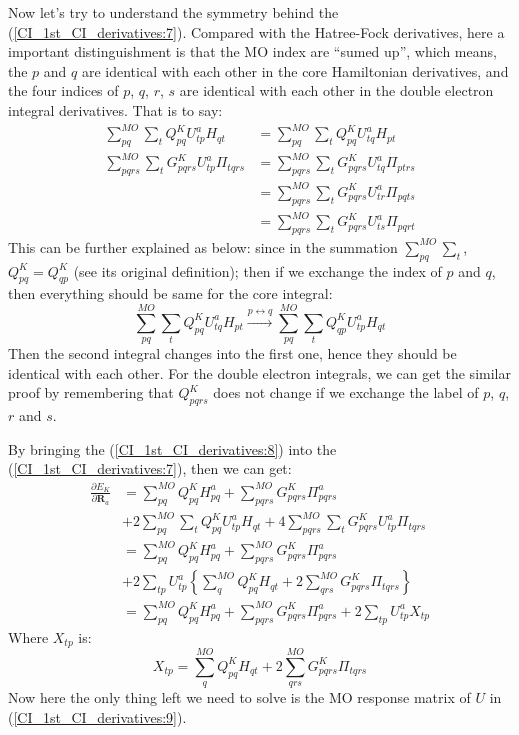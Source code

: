 Now let's try to understand the symmetry behind the
(\ref{CI_1st_CI_derivatives:7}). Compared with the Hatree-Fock derivatives,
here a important distinguishment is that the MO index are ``sumed up'', which
means, the $p$ and $q$ are identical with each other in the core Hamiltonian
derivatives, and the four indices of $p$, $q$, $r$, $s$ are identical with each
other in the double electron integral derivatives. That is to say:
\begin{equation}
 \begin{split}
  \sum_{pq}^{MO}\sum_{t}Q^{K}_{pq}U^{a}_{tp}H_{qt} &=
  \sum_{pq}^{MO}\sum_{t}Q^{K}_{pq}U^{a}_{tq}H_{pt} \\
\sum_{pqrs}^{MO} \sum_{t}G^{K}_{pqrs}
U^{a}_{tp}\Pi_{tqrs}  
&= 
\sum_{pqrs}^{MO} \sum_{t}G^{K}_{pqrs} 
U^{a}_{tq}\Pi_{ptrs} \\ 
&= 
\sum_{pqrs}^{MO} \sum_{t}G^{K}_{pqrs} 
U^{a}_{tr}\Pi_{pqts}  \\
&=
\sum_{pqrs}^{MO} \sum_{t}G^{K}_{pqrs} 
U^{a}_{ts}\Pi_{pqrt}  
 \end{split}
\label{CI_1st_CI_derivatives:8}
\end{equation}
This can be further explained as below: since in the summation
$\sum_{pq}^{MO}\sum_{t}$, $Q^{K}_{pq} = Q^{K}_{qp}$ (see its original
definition); then if we exchange the index of $p$ and $q$, then everything
should be same for the core integral:
\begin{equation}
  \sum_{pq}^{MO}\sum_{t}Q^{K}_{pq}U^{a}_{tq}H_{pt} \xrightarrow{p
\leftrightarrow q} \sum_{pq}^{MO}\sum_{t}Q^{K}_{qp}U^{a}_{tp}H_{qt}
\end{equation}
Then the second integral changes into the first one, hence they should be
identical with each other. For the double electron integrals, we can get the
similar proof by remembering that $Q^{K}_{pqrs}$ does not change if we
exchange the label of $p$, $q$, $r$ and $s$.

By bringing the (\ref{CI_1st_CI_derivatives:8}) into the
(\ref{CI_1st_CI_derivatives:7}), then we can get:
\begin{align}
 \label{CI_1st_CI_derivatives:9}
\frac{\partial E_{K}}{ \partial \bm{R}_{a}} &=
\sum_{pq}^{MO}Q^{K}_{pq}H^{a}_{pq} +
\sum_{pqrs}^{MO}G^{K}_{pqrs}\Pi^{a}_{pqrs} \nonumber \\
&+ 2\sum_{pq}^{MO}\sum_{t}Q^{K}_{pq}U^{a}_{tp}H_{qt} + 
4\sum_{pqrs}^{MO}\sum_{t} G^{K}_{pqrs}
U^{a}_{tp}\Pi_{tqrs} \nonumber \\
&= \sum_{pq}^{MO}Q^{K}_{pq}H^{a}_{pq} +
\sum_{pqrs}^{MO}G^{K}_{pqrs}\Pi^{a}_{pqrs} \nonumber \\
&+ 2\sum_{tp}U^{a}_{tp}\left\lbrace 
\sum_{q}^{MO}Q^{K}_{pq}H_{qt} + 
2\sum_{qrs}^{MO}G^{K}_{pqrs}
\Pi_{tqrs}
\right\rbrace \nonumber \\
&= \sum_{pq}^{MO}Q^{K}_{pq}H^{a}_{pq} +
\sum_{pqrs}^{MO}G^{K}_{pqrs}\Pi^{a}_{pqrs}
+ 2\sum_{tp}U^{a}_{tp}X_{tp}
\end{align}
Where $X_{tp}$ is:
\begin{equation}
 \label{CI_1st_CI_derivatives:10}
X_{tp} = 
\sum_{q}^{MO}Q^{K}_{pq}H_{qt} + 
2\sum_{qrs}^{MO}G^{K}_{pqrs}
\Pi_{tqrs}
\end{equation}
Now here the only thing left we need to solve is the MO response matrix of $U$
in (\ref{CI_1st_CI_derivatives:9}). 

